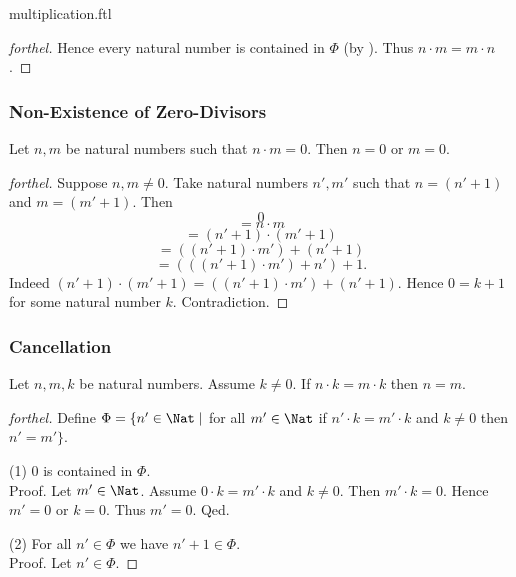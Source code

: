 \documentclass{naproche-library}
\begin{document}
\begin{smodule}{multiplication.ftl}
\begin{proof}[forthel]
    Hence every natural number is contained in $\Phi$ (by ).
    Thus $n \cdot m = m \cdot n$.
  \end{proof}


  \subsubsection*{Non-Existence of Zero-Divisors}

  \begin{proposition}[forthel,id=ARITHMETIC_06_3843962875936768]
    Let $n, m$ be natural numbers such that $n \cdot m = 0$.
    Then $n = 0$ or $m = 0$.
  \end{proposition}
  \begin{proof}[forthel]
    Suppose $n, m \neq 0$.
    Take natural numbers $n', m'$ such that $n = (n' + 1)$ and $m = (m' + 1)$.
    Then
    \[  0                                     \]
    \[    = n \cdot m                         \]
    \[    = (n' + 1) \cdot (m' + 1)           \]
    \[    = ((n' + 1) \cdot m') + (n' + 1)    \]
    \[    = (((n' + 1) \cdot m') + n') + 1.   \]
    Indeed $(n' + 1) \cdot (m' + 1) = ((n' + 1) \cdot m') + (n' + 1)$.
    Hence $0 = k + 1$ for some natural number $k$.
    Contradiction.
  \end{proof}


  \subsubsection*{Cancellation}

  \begin{proposition}[forthel,id=ARITHMETIC_06_31055184658432]
    Let $n, m, k$ be natural numbers.
    Assume $k \neq 0$.
    If $n \cdot k = m \cdot k$ then $n = m$.
  \end{proposition}
  \begin{proof}[forthel]
    Define $\Phi = \{ n' \in \Nat \mid$ for all $m' \in \Nat$ if $n' \cdot k = m' \cdot k$ and $k \neq 0$ then $n' = m' \}$.

    (1) $0$ is contained in $\Phi$. \\
    Proof.
      Let $m' \in \Nat$.
      Assume $0 \cdot k = m' \cdot k$ and $k \neq 0$.
      Then $m' \cdot k = 0$.
      Hence $m' = 0$ or $k = 0$.
      Thus $m' = 0$.
    Qed.

    (2) For all $n' \in \Phi$ we have $n' + 1 \in \Phi$. \\
    Proof.
      Let $n' \in \Phi$.


\end{proof}
\end{smodule}
\end{document}
